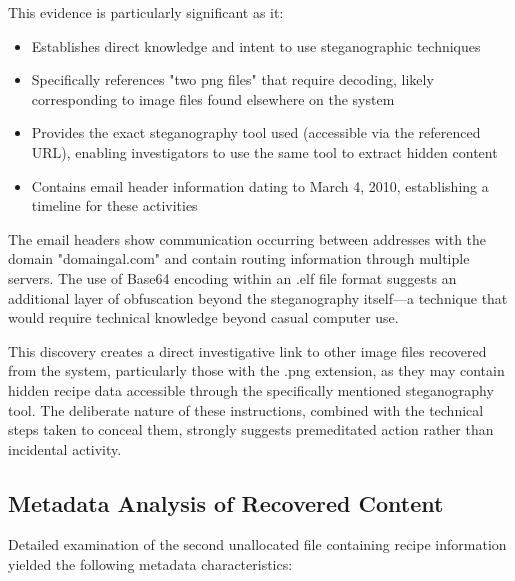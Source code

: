 This evidence is particularly significant as it:

\begin{itemize}
    \item Establishes direct knowledge and intent to use steganographic techniques
    \item Specifically references "two png files" that require decoding, likely corresponding to image files found elsewhere on the system
    \item Provides the exact steganography tool used (accessible via the referenced URL), enabling investigators to use the same tool to extract hidden content
    \item Contains email header information dating to March 4, 2010, establishing a timeline for these activities
\end{itemize}

The email headers show communication occurring between addresses with the domain "domaingal.com" and contain routing information through multiple servers. The use of Base64 encoding within an .elf file format suggests an additional layer of obfuscation beyond the steganography itself—a technique that would require technical knowledge beyond casual computer use.

This discovery creates a direct investigative link to other image files recovered from the system, particularly those with the .png extension, as they may contain hidden recipe data accessible through the specifically mentioned steganography tool. The deliberate nature of these instructions, combined with the technical steps taken to conceal them, strongly suggests premeditated action rather than incidental activity.
\subsection{Metadata Analysis of Recovered Content}
Detailed examination of the second unallocated file containing recipe information yielded the following metadata characteristics:

